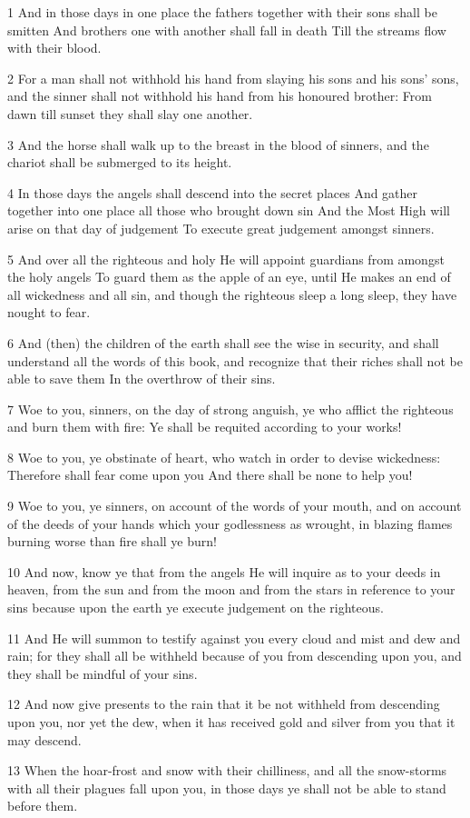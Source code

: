 \par 1 And in those days in one place the fathers together with their sons shall be smitten And brothers one with another shall fall in death Till the streams flow with their blood.
\par 2 For a man shall not withhold his hand from slaying his sons and his sons' sons, and the sinner shall not withhold his hand from his honoured brother: From dawn till sunset they shall slay one another.
\par 3 And the horse shall walk up to the breast in the blood of sinners, and the chariot shall be submerged to its height.
\par 4 In those days the angels shall descend into the secret places And gather together into one place all those who brought down sin And the Most High will arise on that day of judgement To execute great judgement amongst sinners.
\par 5 And over all the righteous and holy He will appoint guardians from amongst the holy angels To guard them as the apple of an eye, until He makes an end of all wickedness and all sin, and though the righteous sleep a long sleep, they have nought to fear.
\par 6 And (then) the children of the earth shall see the wise in security, and shall understand all the words of this book, and recognize that their riches shall not be able to save them In the overthrow of their sins.
\par 7 Woe to you, sinners, on the day of strong anguish, ye who afflict the righteous and burn them with fire: Ye shall be requited according to your works!
\par 8 Woe to you, ye obstinate of heart, who watch in order to devise wickedness: Therefore shall fear come upon you And there shall be none to help you!
\par 9 Woe to you, ye sinners, on account of the words of your mouth, and on account of the deeds of your hands which your godlessness as wrought, in blazing flames burning worse than fire shall ye burn!
\par 10 And now, know ye that from the angels He will inquire as to your deeds in heaven, from the sun and from the moon and from the stars in reference to your sins because upon the earth ye execute judgement on the righteous.
\par 11 And He will summon to testify against you every cloud and mist and dew and rain; for they shall all be withheld because of you from descending upon you, and they shall be mindful of your sins.
\par 12 And now give presents to the rain that it be not withheld from descending upon you, nor yet the dew, when it has received gold and silver from you that it may descend.
\par 13 When the hoar-frost and snow with their chilliness, and all the snow-storms with all their plagues fall upon you, in those days ye shall not be able to stand before them.

